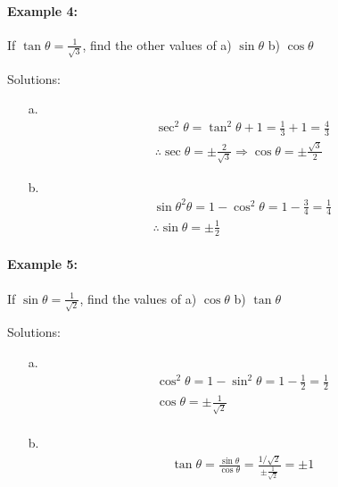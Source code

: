 \documentclass{article}
\begin{document}
\paragraph{Example 4:}
If $\tan\theta = \frac{1}{\sqrt{3}}$, find the other values of a) $\sin\theta$ b) $\cos\theta$

{\small Solutions:}
\begin{enumerate}
        \item[a.]
        \[
        \begin{aligned}
          \sec^{2}\theta = \tan^{2}\theta + 1 = \frac{1}{3}+1 = \frac{4}{3} \\
          \therefore \sec\theta = \pm\frac{2}{\sqrt{3}} \Rightarrow \cos\theta = \pm \frac{\sqrt{3}}{2}
        \end{aligned}
        \]

        \item[b.]
        \[
        \begin{aligned}
          \sin\theta^{2}\theta = 1 - \cos^{2}\theta = 1 - \frac{3}{4} = \frac{1}{4} \\
          \therefore \sin\theta = \pm\frac{1}{2}
        \end{aligned}
        \]
\end{enumerate}

\paragraph{Example 5:}
If $\sin\theta = \frac{1}{\sqrt{2}}$, find the values of a) $\cos\theta$ b) $\tan\theta$

{\small Solutions:}
\begin{enumerate}
        \item[a.]
        \[
        \begin{aligned}
          \cos^{2}\theta = 1 - \sin^{2}\theta = 1 - \frac{1}{2} = \frac{1}{2} \\
          \cos\theta = \pm\frac{1}{\sqrt{2}} \\
        \end{aligned}
        \]

        \item[b.]
        \[
        \begin{aligned}
          \tan\theta = \frac{\sin\theta}{\cos\theta} = \frac{1/\sqrt{2}}{\pm\frac{1}{\sqrt{2}}} = \pm 1
        \end{aligned}
        \]
\end{enumerate}
\end{document}
